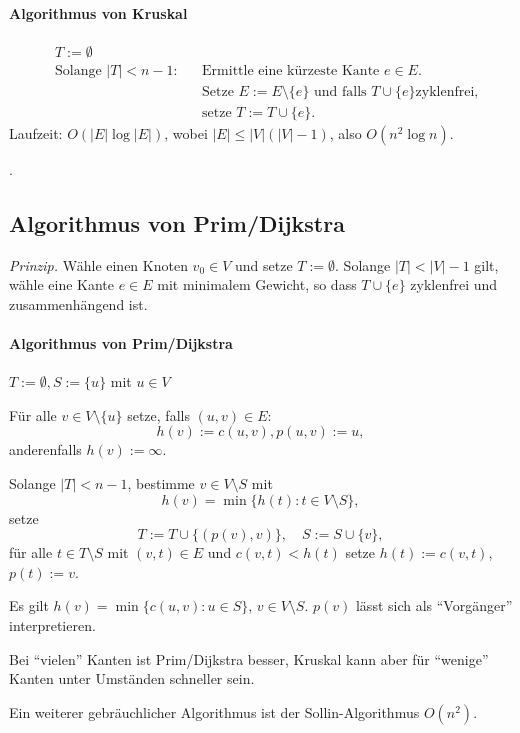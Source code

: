 \paragraph{Algorithmus von Kruskal}
\[ \begin{aligned}
    &T := \emptyset \\
    &\text{Solange } |T| < n - 1: & &\text{Ermittle eine kürzeste Kante } e \in
    E. \\
    & & &\text{Setze } E := E \setminus \{ e \} \text{ und falls } T \cup \{ e
    \} \text{zyklenfrei,} \\
    & & &\text{setze } T := T \cup \{e\}.
  \end{aligned}
\]
Laufzeit: $O(|E| \log |E|)$, wobei $|E| \le |V| ( |V| - 1 )$, also $O(n^2 \log
n)$.

\begin{exmp}
  .
\end{exmp}

\subsection{Algorithmus von Prim/Dijkstra}
\emph{Prinzip.} Wähle einen Knoten $v_0 \in V$ und setze $T := \emptyset$.
Solange $|T| < |V| - 1$ gilt, wähle eine Kante $e \in E$ mit minimalem Gewicht,
so dass $T \cup \{ e \}$ zyklenfrei und zusammenhängend ist.

\paragraph{Algorithmus von Prim/Dijkstra}
$T := \emptyset, S := \{u\}$ mit $u \in V$

Für alle $v \in V \setminus \{u\}$ setze, falls $(u,v) \in E$:
\[ h(v) := c(u,v), p(u,v) := u, \]
anderenfalls $h(v) := \infty$.

Solange $|T| < n - 1$, bestimme $v \in V \setminus S$ mit
\[ h(v) = \min \{ h(t) : t \in V \setminus S \}, \]
setze
\[ T := T \cup \{ (p(v), v) \}, \quad S := S \cup \{ v \}, \]
für alle $t \in T \setminus S$ mit $(v,t) \in E$ und $c(v,t) < h(t)$ setze $h(t)
:= c(v,t)$, $p(t) := v$.

\begin{rmrk*}
  Es gilt $h(v) = \min \{ c(u,v) : u \in S \}$, $v \in V \setminus S$. $p(v)$
  lässt sich als ``Vorgänger'' interpretieren.

  Bei ``vielen'' Kanten ist Prim/Dijkstra besser, Kruskal kann aber
  für ``wenige'' Kanten unter Umständen schneller sein.

  Ein weiterer gebräuchlicher Algorithmus ist der Sollin-Algorithmus $O(n^2)$.
\end{rmrk*}

